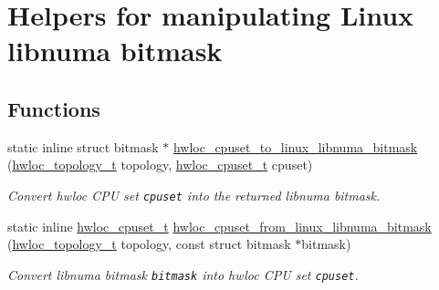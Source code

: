 \hypertarget{group__hwlocality__linux__libnuma__bitmask}{
\section{Helpers for manipulating Linux libnuma bitmask}
\label{group__hwlocality__linux__libnuma__bitmask}
}
\subsection*{Functions}
\begin{CompactItemize}
\item 
static inline struct bitmask $\ast$ \hyperlink{group__hwlocality__linux__libnuma__bitmask_g66720508d673173aea250095be22822d}{hwloc\_\-cpuset\_\-to\_\-linux\_\-libnuma\_\-bitmask} (\hyperlink{group__hwlocality__topology_g9d1e76ee15a7dee158b786c30b6a6e38}{hwloc\_\-topology\_\-t} topology, \hyperlink{group__hwlocality__cpuset_g82e51d695c430832b703dad5ab8d75e4}{hwloc\_\-cpuset\_\-t} cpuset)
\begin{CompactList}\small\item\em Convert hwloc CPU set {\tt cpuset} into the returned libnuma bitmask. \item\end{CompactList}\item 
static inline \hyperlink{group__hwlocality__cpuset_g82e51d695c430832b703dad5ab8d75e4}{hwloc\_\-cpuset\_\-t} \hyperlink{group__hwlocality__linux__libnuma__bitmask_ga7ac171ac41f209bfbc710ca690affe0}{hwloc\_\-cpuset\_\-from\_\-linux\_\-libnuma\_\-bitmask} (\hyperlink{group__hwlocality__topology_g9d1e76ee15a7dee158b786c30b6a6e38}{hwloc\_\-topology\_\-t} topology, const struct bitmask $\ast$bitmask)
\begin{CompactList}\small\item\em Convert libnuma bitmask {\tt bitmask} into hwloc CPU set {\tt cpuset}. \item\end{CompactList}\end{CompactItemize}



